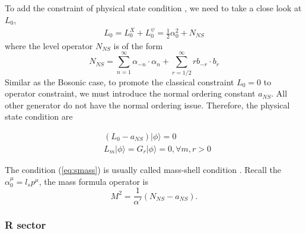 \documentclass[graybox,envcountchap,sectrefs]{svmono}
\begin{document}
To add the constraint of physical state condition , we need to take a close look at $L_0$,
\begin{align}
	L_0=L_0^X+L_0^{\psi}=\frac{1}{2}\alpha_0^2 +N_{NS}
\end{align}
where the level operator $N_{NS}$ is of the form
\begin{equation}
N_{NS}=\sum_{n=1}^{\infty} \alpha_{-n} \cdot \alpha_{n}+\sum_{r=1 / 2}^{\infty} r b_{-r} \cdot b_{r}
\end{equation}
Similar as the Bosonic case, to promote the classical constraint $L_0=0$ to operator constraint, we must introduce the normal ordering constant $a_{NS}$. All other generator do not have the normal ordering issue. Therefore, the physical state condition are
\begin{svgraybox}
\begin{align}
	&(L_0-a_{NS})|\phi\rangle =0 \label{eq:smass}\\
	&L_m|\phi\rangle =G_r|\phi\rangle =0, \forall m,r >0
\end{align}	
\end{svgraybox}
The condition (\ref{eq:smass}) is usually called mass-shell condition .
Recall the $\alpha_0^{\mu}=l_sp^{\mu}$, the mass formula operator is
\begin{equation}
M^2=\frac{1}{\alpha'}(N_{NS}-a_{NS})	.
\end{equation}




\subsubsection*{R sector} 
\end{document}
